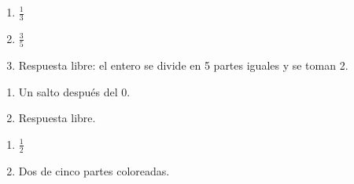 \begin{enumerate}
\item $\frac{1}{3}$
\item $\frac{3}{5}$
\item Respuesta libre: el entero se divide en 5 partes iguales y se toman 2.
\end{enumerate}
\begin{enumerate}
\item Un salto después del 0.
\item Respuesta libre.
\end{enumerate}
\wbanswers{\wbLReview}
\begin{enumerate}
\item $\frac{1}{2}$
\item Dos de cinco partes coloreadas.
\end{enumerate}
